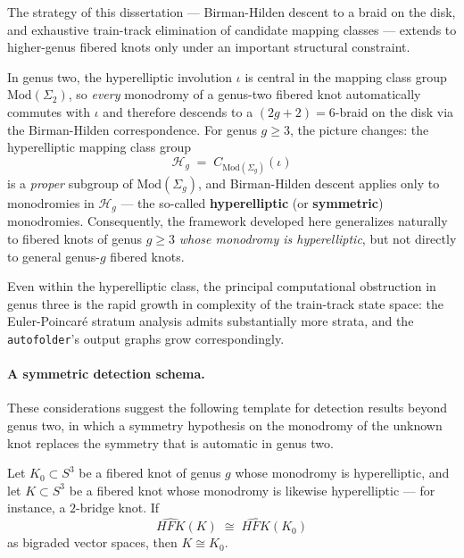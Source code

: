 The strategy of this dissertation ---  Birman-Hilden descent to a braid on the disk, and exhaustive train-track elimination of candidate mapping classes --- extends to higher-genus fibered knots only under an important structural constraint.

In genus two, the hyperelliptic involution $\iota$ is central in the mapping class group $\mathrm{Mod}(\Sigma_2)$, so \emph{every} monodromy of a genus-two fibered knot automatically commutes with $\iota$ and therefore descends to a $(2g+2) = 6$-braid on the disk via the Birman-Hilden correspondence. For genus $g \geq 3$, the picture changes: the hyperelliptic mapping class group
\[
\mathcal{H}_g \;=\; C_{\mathrm{Mod}(\Sigma_g)}(\iota)
\]
is a \emph{proper} subgroup of $\mathrm{Mod}(\Sigma_g)$, and Birman-Hilden descent applies only to monodromies in $\mathcal{H}_g$ --- the so-called \textbf{hyperelliptic} (or \textbf{symmetric}) monodromies. Consequently, the framework developed here generalizes naturally to fibered knots of genus $g \geq 3$ \emph{whose monodromy is hyperelliptic}, but not directly to general genus-$g$ fibered knots. 

Even within the hyperelliptic class, the principal computational obstruction in genus three is the rapid growth in complexity of the train-track state space: the Euler-Poincar\'{e} stratum analysis admits substantially more strata, and the \texttt{autofolder}'s output graphs grow correspondingly. 

\makeatletter
{}
\makeatother

\paragraph{A symmetric detection schema.}
These considerations suggest the following template for detection results beyond genus two, in which a symmetry hypothesis on the monodromy of the unknown knot replaces the symmetry that is automatic in genus two.

\begin{conjecture}\label{conj:symmetric_detection}
Let $K_0 \subset S^3$ be a fibered knot of genus $g$ whose monodromy is hyperelliptic, and let $K \subset S^3$ be a fibered knot whose monodromy is likewise hyperelliptic --- for instance, a $2$-bridge knot. If
\[
\widehat{HFK}(K) \;\cong\; \widehat{HFK}(K_0)
\]
as bigraded vector spaces, then $K \cong K_0$.
\end{conjecture}

